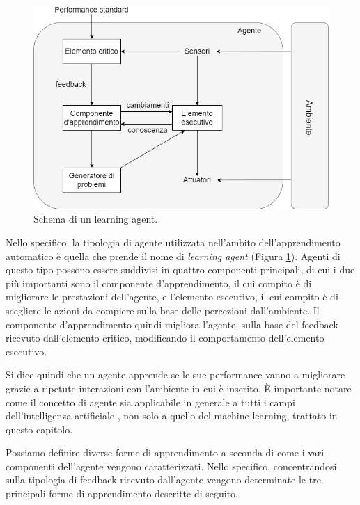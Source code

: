 \documentclass[../../main.tex]{subfiles}
\begin{document}
    \begin{figure}[H]
        \centering
        \includegraphics[width =\textwidth]{immagini/4_0/learning_agent.png}
        \caption{Schema di un learning agent.}
        \label{fig:learning_agent}
    \end{figure}

    Nello specifico, la tipologia di agente utilizzata nell'ambito dell'apprendimento automatico è quella che prende il nome di \textit{learning agent} (Figura \ref{fig:learning_agent}). Agenti di questo tipo possono essere suddivisi in quattro componenti principali, di cui i due più importanti sono il componente d'apprendimento, il cui compito è di migliorare le prestazioni dell'agente, e l'elemento esecutivo, il cui compito è di scegliere le azioni da compiere sulla base delle percezioni dall'ambiente. Il componente d'apprendimento quindi migliora l'agente, sulla base del feedback ricevuto dall'elemento critico, modificando il comportamento dell'elemento esecutivo.

    Si dice quindi che un agente apprende se le sue performance vanno a migliorare grazie a ripetute interazioni con l'ambiente in cui è inserito.
    È importante notare come il concetto di agente sia applicabile in generale a tutti i campi dell'intelligenza artificiale \cite{russel2010}, non solo a quello del machine learning, trattato in questo capitolo.

    Possiamo definire diverse forme di apprendimento a seconda di come i vari componenti dell'agente vengono caratterizzati. Nello specifico, concentrandosi sulla tipologia di feedback ricevuto dall'agente vengono determinate le tre principali forme di apprendimento descritte di seguito.
    
\end{document}
